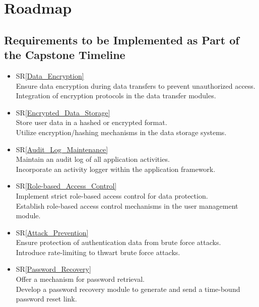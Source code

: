 \documentclass{article}
\newcommand{\srref}[1]{SR\ref{#1}}
\begin{document}
\section{Roadmap}

\subsection{Requirements to be Implemented as Part of the Capstone Timeline}
\begin{itemize}
    \item \srref{Data_Encryption} \\
    Ensure data encryption during data transfers to prevent unauthorized access. \\
    Integration of encryption protocols in the data transfer modules. \\
    
    \item \srref{Encrypted_Data_Storage} \\
    Store user data in a hashed or encrypted format. \\
    Utilize encryption/hashing mechanisms in the data storage systems. \\
    
    \item \srref{Audit_Log_Maintenance} \\
    Maintain an audit log of all application activities. \\
    Incorporate an activity logger within the application framework. \\
    
    \item \srref{Role-based_Access_Control} \\
    Implement strict role-based access control for data protection. \\
    Establish role-based access control mechanisms in the user management module. \\
    
    \item \srref{Attack_Prevention} \\
    Ensure protection of authentication data from brute force attacks. \\
    Introduce rate-limiting to thwart brute force attacks. \\
    
    \item \srref{Password_Recovery} \\
    Offer a mechanism for password retrieval. \\
    Develop a password recovery module to generate and send a time-bound password reset link. \\
\end{itemize}
\end{document}
